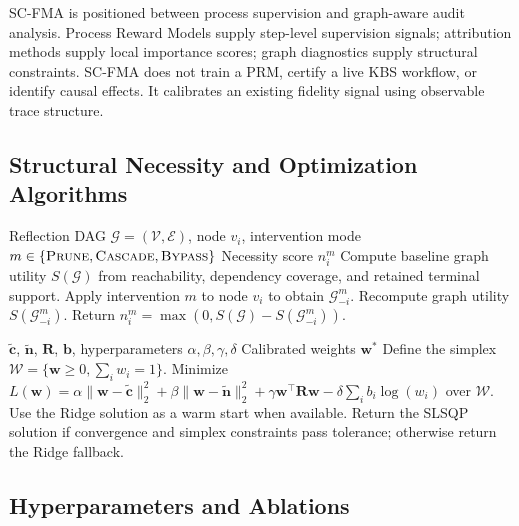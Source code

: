 \documentclass[a4paper,fleqn]{cas-sc}
\begin{document}
SC-FMA is positioned between process supervision and graph-aware audit analysis. Process Reward Models supply step-level supervision signals; attribution methods supply local importance scores; graph diagnostics supply structural constraints. SC-FMA does not train a PRM, certify a live KBS workflow, or identify causal effects. It calibrates an existing fidelity signal using observable trace structure.

\subsection{Structural Necessity and Optimization Algorithms}
\label{app:algorithms}

\begin{algorithm}[ht]
\caption{Structural Necessity Computation}
\label{alg:supp-structural-necessity}
\begin{algorithmic}[1]
\Require Reflection DAG $\mathcal{G}=(\mathcal{V},\mathcal{E})$, node $v_i$, intervention mode $m\in\{\textsc{Prune},\textsc{Cascade},\textsc{Bypass}\}$
\Ensure Necessity score $n_i^{m}$
\State Compute baseline graph utility $S(\mathcal{G})$ from reachability, dependency coverage, and retained terminal support.
\State Apply intervention $m$ to node $v_i$ to obtain $\mathcal{G}_{-i}^{m}$.
\State Recompute graph utility $S(\mathcal{G}_{-i}^{m})$.
\State Return $n_i^{m}=\max(0,S(\mathcal{G})-S(\mathcal{G}_{-i}^{m}))$.
\end{algorithmic}
\end{algorithm}

\begin{algorithm}[ht]
\caption{SC-FMA QP Calibration}
\label{alg:supp-scfma-qp}
\begin{algorithmic}[1]
\Require $\tilde{\mathbf{c}}$, $\tilde{\mathbf{n}}$, $\mathbf{R}$, $\mathbf{b}$, hyperparameters $\alpha,\beta,\gamma,\delta$
\Ensure Calibrated weights $\mathbf{w}^*$
\State Define the simplex $\mathcal{W}=\{\mathbf{w}\ge 0,\sum_i w_i=1\}$.
\State Minimize $L(\mathbf{w})=\alpha\|\mathbf{w}-\tilde{\mathbf{c}}\|_2^2+\beta\|\mathbf{w}-\tilde{\mathbf{n}}\|_2^2+\gamma\mathbf{w}^\top\mathbf{R}\mathbf{w}-\delta\sum_i b_i\log(w_i)$ over $\mathcal{W}$.
\State Use the Ridge solution as a warm start when available.
\State Return the SLSQP solution if convergence and simplex constraints pass tolerance; otherwise return the Ridge fallback.
\end{algorithmic}
\end{algorithm}

\subsection{Hyperparameters and Ablations}
\label{app:hyperparameters-ablation}
\end{document}
